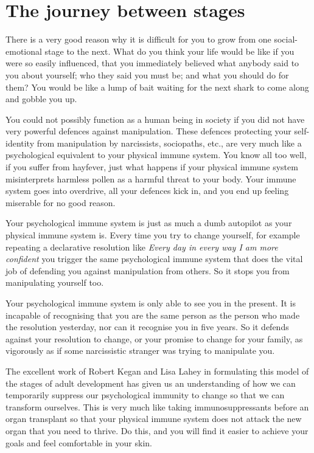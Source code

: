 \section{The journey between stages}
There is a very good reason why it is difficult for you to grow from one social-emotional stage to the next. What do you think your life would be like if you were so easily influenced, that you immediately believed what anybody said to you about yourself; who they said you must be; and what you should do for them? You would be like a lump of bait waiting for the next shark to come along and gobble you up.


You could not possibly function as a human being in society if you did not have very powerful defences against manipulation. These defences protecting your self-identity from manipulation by narcissists, sociopaths, etc., are very much like a psychological equivalent to your physical immune system. You know all too well, if you suffer from hayfever, just what happens if your physical immune system misinterprets harmless pollen as a harmful threat to your body. Your immune system goes into overdrive, all your defences kick in, and you end up feeling miserable for no good reason.


Your psychological immune system is just as much a dumb autopilot as your physical immune system is. Every time you try to change yourself, for example repeating a declarative resolution like \emph{Every day in every way I am more confident} you trigger the same psychological immune system that does the vital job of defending you against manipulation from others. So it stops you from manipulating yourself too. 


Your psychological immune system is only able to see you in the present. It is incapable of recognising that you are the same person as the person who made the resolution yesterday, nor can it recognise you in five years. So it defends against your resolution to change, or your promise to change for your family, as vigorously as if some narcissistic stranger was trying to manipulate you.


The excellent work of Robert Kegan and Lisa Lahey\cite{kegan-everyone} in formulating this model of the stages of adult development has given us an understanding of how we can temporarily suppress our psychological immunity to change so that we can transform ourselves. This is very much like taking immunosuppressants before an organ transplant so that your physical immune system does not attack the new organ that you need to thrive. Do this, and you will find it easier to achieve your goals and feel comfortable in your skin.